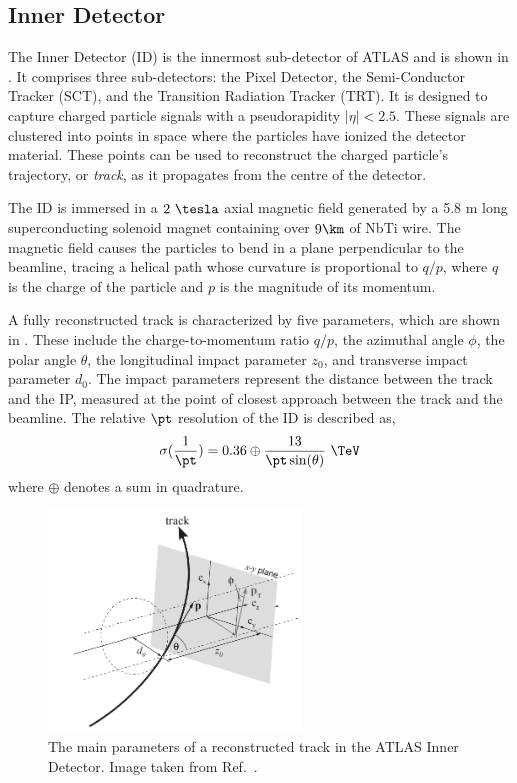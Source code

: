 \subsection{Inner Detector}

The Inner Detector (ID) is the innermost sub-detector of ATLAS and is shown in .
It comprises three sub-detectors: the Pixel Detector, the Semi-Conductor Tracker (SCT), and the Transition Radiation Tracker (TRT).
It is designed to capture charged particle signals with a pseudorapidity $|\eta| < 2.5$.
These signals are clustered into points in space where the particles have ionized the detector material.
These points can be used to reconstruct the charged particle's trajectory, or \textit{track}, as it propagates from the centre of the detector.

The ID is immersed in a $2~\tesla$ axial magnetic field generated by a 5.8 m long superconducting solenoid magnet containing over $9\km$ of NbTi wire.
The magnetic field causes the particles to bend in a plane perpendicular to the beamline, tracing a helical path whose curvature is proportional to $q/p$, where $q$ is the charge of the particle and $p$ is the magnitude of its momentum.

A fully reconstructed track is characterized by five parameters, which are shown in .
These include the charge-to-momentum ratio $q/p$, the azimuthal angle $\phi$, the polar angle $\theta$, the longitudinal impact parameter  $z_0$, and transverse impact parameter $d_0$.
The impact parameters represent the distance between the track and the IP, measured at the point of closest approach between the track and the beamline.
The relative $\pt$ resolution of the ID is described as,
\begin{equation}
    \sigma(\frac{1}{\pt}) = 0.36 \oplus \frac{13}{\pt \sin(\theta)}~\TeV
\end{equation}
where $\oplus$ denotes a sum in quadrature.

\begin{figure}[htb]
    \centering
    \includegraphics[width=0.6\textwidth]{Figures/cern_atlas/Track.png}
    \caption{The main parameters of a reconstructed track in the ATLAS Inner Detector. Image taken from Ref.~\cite{ATLASTrackingSoftware}.}
    \label{fig:track_parameters}
\end{figure}

